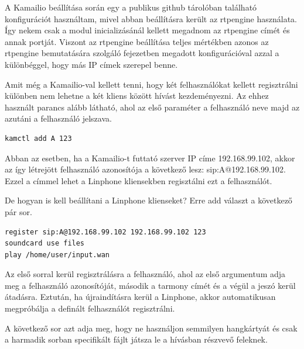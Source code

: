 A Kamailio beállítása során egy a publikus github tárolóban található konfigurációt
használtam, mivel abban beállításra került az rtpengine használata. Így nekem 
csak a modul inicializásánál kellett megadnom az rtpengine címét és annak portját. 
Viszont az rtpengine beállítása teljes mértékben azonos az rtpengine bemutatására
szolgáló fejezetben megadott konfigurációval azzal a különbéggel, hogy más IP
címek szerepel benne.

Amit még a Kamailio-val kellett tenni, hogy két felhasználókat kellett regisztrálni
különben nem lehetne a két kliens között hívást kezdeményezni. Az ehhez használt parancs
alább látható, ahol az első paraméter a felhasználó neve majd az azutáni a felhasználó
jelszava.

\begin{lstlisting}
kamctl add A 123
\end{lstlisting}

Abban az esetben, ha a Kamailio-t futtató szerver IP címe 192.168.99.102, akkor az 
így létrejött felhasználó azonosítója a következő lesz: sip:A@192.168.99.102. Ezzel a
címmel lehet a Linphone kliensekben regisztálni ezt a felhasználót. 

De hogyan is kell beállítani a Linphone klienseket? Erre add választ a következő 
pár sor. 

\begin{lstlisting}
register sip:A@192.168.99.102 192.168.99.102 123
soundcard use files
play /home/user/input.wan
\end{lstlisting}

Az első sorral kerül regisztrálásra a felhasználó, ahol az első argumentum adja meg a 
felhasználó azonosítóját, második a tarmony címét és a végül a jeszó kerül átadásra. 
Eztután, ha újraindításra kerül a Linphone, akkor automatikusan megpróbálja a definált
felhasználót regisztrálni. 

A következő sor azt adja meg, hogy ne használjon semmilyen hangkártyát és csak a 
harmadik sorban specifikált fájlt játsza le a hívásban részvevő feleknek.  \\

